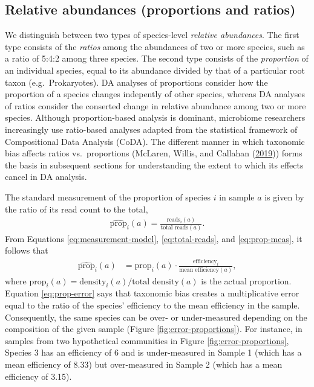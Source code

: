 \documentclass[
]{article}
\begin{document}
\hypertarget{relative-abundances-proportions-and-ratios}{%
\subsection{Relative abundances (proportions and ratios)}\label{relative-abundances-proportions-and-ratios}}

We distinguish between two types of species-level \emph{relative abundances}.
The first type consists of the \emph{ratios} among the abundances of two or more species, such as a ratio of 5:4:2 among three species.
The second type consists of the \emph{proportion} of an individual species, equal to its abundance divided by that of a particular root taxon (e.g.~Prokaryotes).
DA analyses of proportions consider how the proportion of a species changes indepently of other species, whereas DA analyses of ratios consider the conserted change in relative abundance among two or more species.
Although proportion-based analysis is dominant, microbiome researchers increasingly use ratio-based analyses adapted from the statistical framework of Compositional Data Analysis (CoDA).
The different manner in which taxonomic bias affects ratios vs.~proportions (McLaren, Willis, and Callahan (\protect\hyperlink{ref-mclaren2019cons}{2019})) forms the basis in subsequent sections for understanding the extent to which its effects cancel in DA analysis.

The standard measurement of the proportion of species \(i\) in sample \(a\) is given by the ratio of its read count to the total,
\begin{align}
  \label{eq:prop-meas}
  \widehat{\text{prop}}_{i}(a) = \frac{\text{reads}_i(a)}{\text{total reads}(a)}.
\end{align}
From Equations \eqref{eq:measurement-model}, \eqref{eq:total-reads}, and \eqref{eq:prop-meas}, it follows that
\begin{align}
  \label{eq:prop-error}
  \widehat{\text{prop}}_{i}(a)
  &= \text{prop}_{i}(a) \cdot \frac{\text{efficiency}_{i}}{\text{mean efficiency}(a)},
\end{align}
where \(\text{prop}_{i}(a) = \text{density}_{i}(a) / \text{total density}(a)\) is the actual proportion.
Equation \eqref{eq:prop-error} says that taxonomic bias creates a multiplicative error equal to the ratio of the species' efficiency to the mean efficiency in the sample.
Consequently, the same species can be over- or under-measured depending on the composition of the given sample (Figure \ref{fig:error-proportions}).
For instance, in samples from two hypothetical communities in Figure \ref{fig:error-proportions}, Species 3 has an efficiency of 6 and is under-measured in Sample 1 (which has a mean efficiency of 8.33) but over-measured in Sample 2 (which has a mean efficiency of 3.15).
\end{document}
